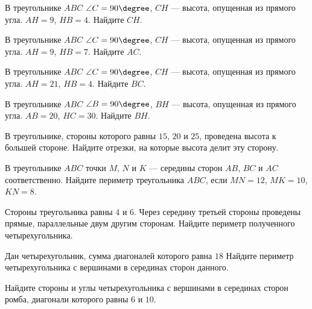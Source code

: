 \begin{consultation}[number=1]
	\begin{listofex}
		\item В треугольнике \( ABC \) \( \angle C=90\degree \), \( CH \) --- высота, опущенная из прямого угла. \( AH=9 \), \( HB=4 \). Найдите \( CH \).
		\item В треугольнике \( ABC \) \( \angle C=90\degree \), \( CH \) --- высота, опущенная из прямого угла. \( AH=9 \), \( HB=7 \). Найдите \( AC \).
		\item В треугольнике \( ABC \) \( \angle C=90\degree \), \( CH \) --- высота, опущенная из прямого угла. \( AH=21 \), \( HB=4 \). Найдите \( BC \).
		\item В треугольнике \( ABC \) \( \angle B=90\degree \), \( BH \) --- высота, опущенная из прямого угла. \( AB=20 \), \( HC=30 \). Найдите \( BH \).
		\item В треугольнике, стороны которого равны \( 15 \), \( 20 \) и \( 25 \), проведена высота к большей стороне. Найдите отрезки, на которые высота делит эту сторону.
		\item В треугольнике \( ABC \) точки \( M \), \( N \) и \( K \) --- середины сторон \( AB \), \( BC \) и \( AC \) соответственно. Найдите периметр треугольника \( ABC \), если \( MN=12 \), \( MK=10 \), \( KN=8 \).
		\item Стороны треугольника равны \( 4 \) и \( 6 \). Через середину третьей стороны проведены прямые, параллельные двум другим сторонам. Найдите периметр полученного четырехугольника.
		\item Дан четырехугольник, сумма диагоналей которого равна \( 18 \) Найдите периметр четырехугольника с вершинами в серединах сторон данного.
		\item Найдите стороны и углы четырехугольника с вершинами в серединах сторон ромба, диагонали которого равны \( 6 \) и \( 10 \).
	\end{listofex}
\end{consultation}
